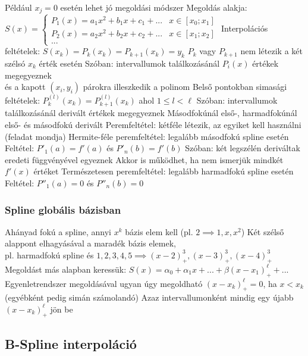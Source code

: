 \documentclass[12pt,a4paper]{article}
\begin{document}
\begin{outline}
	\1 Például $x_j = 0$ esetén lehet jó megoldási módszer
	\1 Megoldás alakja: $S(x) = \begin{cases}
		P_1(x) = a_1x^2 + b_1x + c_1 + ... & x \in [x_0;x_1] \\
		P_2(x) = a_2x^2 + b_2x + c_2 + ... & x \in [x_1;x_2] \\
		...
	\end{cases}$
	\1 Interpolációs feltételek: $S(x_k)=P_{k}(x_k)=P_{k+1}(x_k)=y_k$
		\2 $P_k$ vagy $P_{k+1}$ nem létezik a két szélsó $x_k$ érték esetén
		\2 Szóban: intervallumok találkozásánál $P_i(x)$ értékek megegyeznek\\
		és a kapott $(x_i,y_i)$ párokra illeszkedik a polinom
	\1 Belső pontokban simasági feltételek: $P^{(l)}_k(x_k) = P^{(l)}_{k+1}(x_k)$
		ahol $1 \le l < \ell$
		\2 Szóban: intervallumok találkozásánál derivált értékek megegyeznek
		\2 Másodfokúnál első-, harmadfokúnál első- és másodfokú derivált
	\1 Peremfeltétel: kétféle létezik, az egyiket kell használni (feladat mondja)
		\2 Hermite-féle peremfeltétel: legalább másodfokú spline esetén
			\3 Feltétel: $P'_1(a)=f'(a)$ és $P'_n(b)=f'(b)$
			\3 Szóban: két legszélén deriváltak eredeti függvényével egyeznek
			\3 Akkor is működhet, ha nem ismerjük mindkét $f'(x)$ értéket
		\2 Természetesen peremfeltétel: legalább harmadfokú spline esetén
			\3 Feltétel: $P''_1(a)=0$ és $P''_n(b)=0$
\end{outline}

\subsubsection{Spline globális bázisban}

\begin{outline}
	\1 Ahányad fokú a spline, annyi $x^k$ bázis elem kell (pl. $2 \implies 1,x,x^2$)
	\1 Két szélső alappont elhagyásával a maradék bázis elemek,\\
	pl. harmadfokú spline és $1,2,3,4,5 \implies (x-2)^3_+, (x-3)^3_+, (x-4)^3_+$
	\1 Megoldást más alapban keressük:
	$S(x) = \alpha_0 + \alpha_1x + ... + \beta(x-x_1)^\ell_+ + ...$
		\2 Egyenletrendszer megoldásával ugyan úgy megoldható
		\2 $(x-x_k)^\ell_+ = 0$, ha $x < x_k$ (egyébként pedig simán számolandó)
		\2 Azaz intervallumonként mindig egy újabb $(x-x_k)^\ell_+$ jön be
\end{outline}

\subsection{B-Spline interpoláció}
\end{document}

